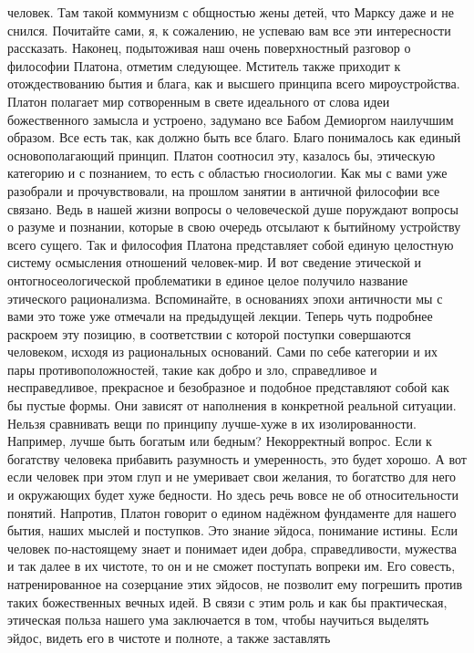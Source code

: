 человек. Там такой коммунизм с общностью жены детей, что Марксу даже и не
снился. Почитайте сами, я, к сожалению, не успеваю вам все эти интересности
рассказать. Наконец, подытоживая наш очень поверхностный разговор о философии
Платона, отметим следующее. Мститель также приходит к отождествованию бытия и
блага, как и высшего принципа всего мироустройства. Платон полагает мир
сотворенным в свете идеального от слова идеи божественного замысла и устроено,
задумано все Бабом Демиоргом наилучшим образом. Все есть так, как должно быть
все благо. Благо понималось как единый основополагающий принцип. Платон
соотносил эту, казалось бы, этическую категорию и с познанием, то есть с
областью гносиологии. Как мы с вами уже разобрали и прочувствовали, на прошлом
занятии в античной философии все связано. Ведь в нашей жизни вопросы о
человеческой душе поруждают вопросы о разуме и познании, которые в свою очередь
отсылают к бытийному устройству всего сущего. Так и философия Платона
представляет собой единую целостную систему осмысления отношений человек-мир. И
вот сведение этической и онтогносеологической проблематики в единое целое
получило название этического рационализма. Вспоминайте, в основаниях эпохи
античности мы с вами это тоже уже отмечали на предыдущей лекции. Теперь чуть
подробнее раскроем эту позицию, в соответствии с которой поступки совершаются
человеком, исходя из рациональных оснований. Сами по себе категории и их пары
противоположностей, такие как добро и зло, справедливое и несправедливое,
прекрасное и безобразное и подобное представляют собой как бы пустые формы. Они
зависят от наполнения в конкретной реальной ситуации. Нельзя сравнивать вещи по
принципу лучше-хуже в их изолированности. Например, лучше быть богатым или
бедным? Некорректный вопрос. Если к богатству человека прибавить разумность и
умеренность, это будет хорошо. А вот если человек при этом глуп и не умеривает
свои желания, то богатство для него и окружающих будет хуже бедности. Но здесь
речь вовсе не об относительности понятий. Напротив, Платон говорит о едином
надёжном фундаменте для нашего бытия, наших мыслей и поступков. Это знание
эйдоса, понимание истины. Если человек по-настоящему знает и понимает идеи
добра, справедливости, мужества и так далее в их чистоте, то он и не сможет
поступать вопреки им. Его совесть, натренированное на созерцание этих эйдосов,
не позволит ему погрешить против таких божественных вечных идей. В связи с этим
роль и как бы практическая, этическая польза нашего ума заключается в том, чтобы
научиться выделять эйдос, видеть его в чистоте и полноте, а также заставлять
